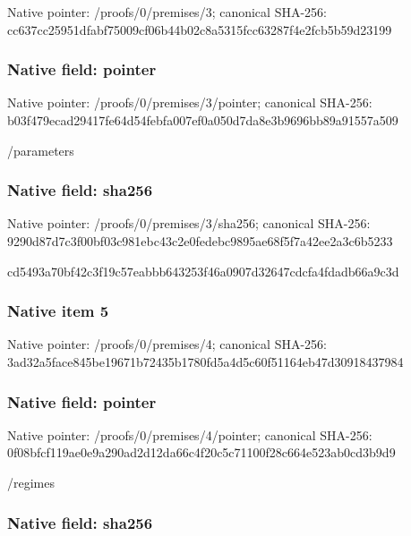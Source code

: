 \documentclass[10pt,a4paper]{article}
\begin{document}
Native pointer: /proofs/0/premises/3; canonical SHA-256: cc637cc25951dfabf75009cf\allowbreak{}06b44b02c8a5315fcc63287f\allowbreak{}4e2fcb5b59d23199



\subsubsection{Native field: pointer}


Native pointer: /proofs/0/premises/3/pointer; canonical SHA-256: b03f479ecad29417fe64d54f\allowbreak{}ebfa007ef0a050d7da8e3b96\allowbreak{}96bb89a91557a509


/parameters


\subsubsection{Native field: sha256}


Native pointer: /proofs/0/premises/3/sha256; canonical SHA-256: 9290d87d7c3f00bf03c981eb\allowbreak{}c43c2e0fedebc9895ae68f5f\allowbreak{}7a42ee2a3c6b5233


cd5493a70bf42c3f19c57eab\allowbreak{}bb643253f46a0907d32647cd\allowbreak{}cfa4fdadb66a9c3d


\subsubsection{Native item 5}


Native pointer: /proofs/0/premises/4; canonical SHA-256: 3ad32a5face845be19671b72\allowbreak{}435b1780fd5a4d5c60f51164\allowbreak{}eb47d30918437984



\subsubsection{Native field: pointer}


Native pointer: /proofs/0/premises/4/pointer; canonical SHA-256: 0f08bfcf119ae0e9a290ad2d\allowbreak{}12da66c4f20c5c71100f28c6\allowbreak{}64e523ab0cd3b9d9


/regimes


\subsubsection{Native field: sha256}
\end{document}
